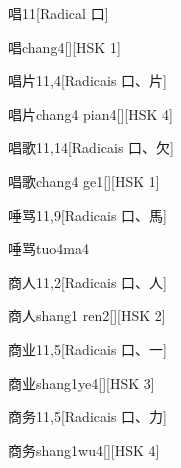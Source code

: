 \begin{entry}{唱}{11}[Radical ⼝]
  \begin{phonetics}{唱}{chang4}[][HSK 1]
  \end{phonetics}
\end{entry}

\begin{entry}{唱片}{11,4}[Radicais ⼝、⽚]
  \begin{phonetics}{唱片}{chang4 pian4}[][HSK 4]
  \end{phonetics}
\end{entry}

\begin{entry}{唱歌}{11,14}[Radicais ⼝、⽋]
  \begin{phonetics}{唱歌}{chang4 ge1}[][HSK 1]
  \end{phonetics}
\end{entry}

\begin{entry}{唾骂}{11,9}[Radicais ⼝、⾺]
  \begin{phonetics}{唾骂}{tuo4ma4}
  \end{phonetics}
\end{entry}

\begin{entry}{商人}{11,2}[Radicais ⼝、⼈]
  \begin{phonetics}{商人}{shang1 ren2}[][HSK 2]
  \end{phonetics}
\end{entry}

\begin{entry}{商业}{11,5}[Radicais ⼝、⼀]
  \begin{phonetics}{商业}{shang1ye4}[][HSK 3]
  \end{phonetics}
\end{entry}

\begin{entry}{商务}{11,5}[Radicais ⼝、⼒]
  \begin{phonetics}{商务}{shang1wu4}[][HSK 4]
  \end{phonetics}
\end{entry}

